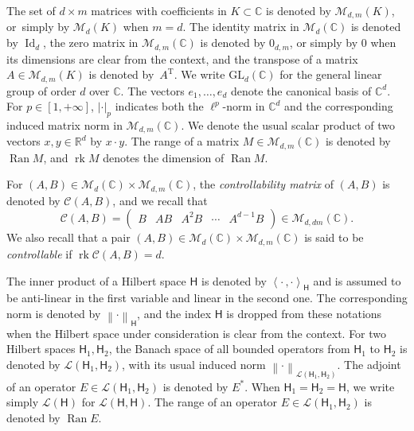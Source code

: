 \documentclass[10pt]{amsart}
\theoremstyle{plain}
\theoremstyle{definition}
\DeclareMathOperator{\rank}{rk}
\DeclareMathOperator{\range}{Ran}
\DeclareMathOperator{\id}{Id}
\newcommand{\transp}{{\scriptscriptstyle\mathrm{T}}}
\newcommand{\norm}[1]{\left\lVert #1\right\lVert}
\newcommand{\abs}[1]{\left\lvert #1\right \rvert}
\newcommand{\scalprod}[2]{\left\langle #1, #2 \right\rangle}
\begin{document}
The set of $d \times m$ matrices with coefficients in $K \subset \mathbb C$ is denoted by $\mathcal M_{d, m}(K)$, or~simply by $\mathcal M_d(K)$ when $m = d$. The identity matrix in $\mathcal M_d(\mathbb C)$ is denoted by $\id_d$, the zero matrix in $\mathcal M_{d, m}(\mathbb C)$ is denoted by $0_{d, m}$, or simply by $0$ when its dimensions are clear from the context, and the transpose of a matrix $A \in \mathcal M_{d, m}(K)$ is denoted by~$A^\transp$. We write $\mathrm{GL}_d(\mathbb C)$ for the general linear group of order $d$ over $\mathbb C$. The vectors $e_1, \dots, e_d$ denote the canonical basis of $\mathbb C^d$. For $p \in [1, +\infty]$, $\abs{\cdot}_{p}$ indicates both the $\ell^p$-norm in $\mathbb C^d$ and the corresponding induced matrix norm in $\mathcal M_{d, m}(\mathbb C)$. We denote the usual scalar product of two vectors $x, y \in \mathbb R^d$ by $x \cdot y$. The range of a matrix $M \in \mathcal M_{d, m}(\mathbb C)$ is denoted by $\range M$, and $\rank M$ denotes the dimension of $\range M$.

For $(A, B) \in \mathcal M_{d}(\mathbb C) \times \mathcal M_{d, m}(\mathbb C)$, the \emph{controllability matrix} of $(A, B)$ is denoted by $\mathcal C(A, B)$, and we recall that
\[
\mathcal C(A, B) = \begin{pmatrix}
B & A B & A^2 B & \cdots & A^{d-1} B \\
\end{pmatrix} \in \mathcal M_{d, d m}(\mathbb C).
\]
We also recall that a pair $(A, B) \in \mathcal M_{d}(\mathbb C) \times \mathcal M_{d, m}(\mathbb C)$ is said to be \emph{controllable} if $\rank \mathcal C(A, B) = d$.

The inner product of a Hilbert space $\mathsf H$ is denoted by $\scalprod{\cdot\,}{\cdot}_{\mathsf H}$ and is assumed to be anti-linear in the first variable and linear in the second one. The corresponding norm is denoted by $\norm{\cdot}_{\mathsf H}$, and the index $\mathsf H$ is dropped from these notations when the Hilbert space under consideration is clear from the context. For two Hilbert spaces $\mathsf H_1, \mathsf H_2$, the Banach space of all bounded operators from $\mathsf H_1$ to $\mathsf H_2$ is denoted by $\mathcal L(\mathsf H_1, \mathsf H_2)$, with its usual induced norm $\norm{\cdot}_{\mathcal L(\mathsf H_1, \mathsf H_2)}$. The adjoint of an operator $E \in \mathcal L(\mathsf H_1, \mathsf H_2)$ is denoted by $E^\ast$. When $\mathsf H_1 = \mathsf H_2 = \mathsf H$, we write simply $\mathcal L(\mathsf H)$ for $\mathcal L(\mathsf H, \mathsf H)$. The range of an operator $E \in \mathcal L(\mathsf H_1, \mathsf H_2)$ is denoted by $\range E$.
\end{document}
